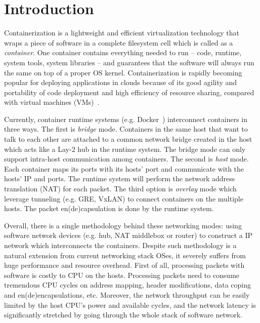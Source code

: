 \section{Introduction} \label{sec:introduction}


Containerization is a lightweight and efficient virtualization technology that wraps a piece of software in a complete filesystem cell which is called as a {\em container}. One container 
contains everything needed to run -- code, runtime, system tools, system libraries -- and guarantees that the software will always run the same on top of a proper OS kernel. Containerization is rapidly
becoming popular for deploying applications in clouds because of its good agility and portability of code deployment and high efficiency of resource sharing, compared with virtual machines (VMs)~\cite{?}.


Currently, container runtime systems (e.g. Docker~\cite{?}) interconnect containers in three ways. 
The first is {\em bridge} mode. Containers in the same host that want to talk to each other are attached to a common network bridge created in the host which acts like a Lay-2 hub in the runtime system. The bridge mode can only support intra-host communication among containers. The second is {\em host} mode. Each container maps its ports with its hosts' port and communicate with the hosts' IP and ports. The runtime system will perform the network address translation (NAT) for each packet. The third option is {\em overlay} mode which leverage tunneling (e.g. GRE, VxLAN) to connect containers on the multiple hosts. The packet en(de)capsulation is done by the runtime system. 

Overall, there is a single methodology behind these networking modes: using software 
network devices (e.g. hub, NAT middlebox or router) to construct a IP network which interconnects the containers. 
Despite such methodology is a natural extension from current networking stack OSes, it severely suffers from huge performance and resource overhead. First of all, processing packets with software is costly to CPU on the hosts. Processing packets need to consume tremendous CPU cycles on address mapping, header modifications, data coping and en(de)encapsulations, etc. 
Moreover, the network throughput can be easily limited by the host CPU's power and available cycles, and the network latency is significantly stretched by going through the whole stack of software network. 

